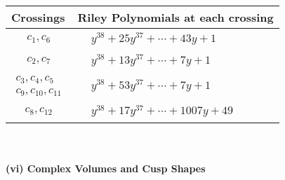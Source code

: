 \documentclass[1p]{elsarticle_modified}
\theoremstyle{definition}
\begin{document}
\begin{tabular}{m{50pt}|m{274pt}}
Crossings & \hspace{64pt}Riley Polynomials at each crossing \\
\hline $$\begin{aligned}c_{1},c_{6}\end{aligned}$$&$\begin{aligned}
&y^{38}+25 y^{37}+\cdots+43 y+1
\end{aligned}$\\
\hline $$\begin{aligned}c_{2},c_{7}\end{aligned}$$&$\begin{aligned}
&y^{38}+13 y^{37}+\cdots+7 y+1
\end{aligned}$\\
\hline $$\begin{aligned}c_{3},c_{4},c_{5}\\c_{9},c_{10},c_{11}\end{aligned}$$&$\begin{aligned}
&y^{38}+53 y^{37}+\cdots+7 y+1
\end{aligned}$\\
\hline $$\begin{aligned}c_{8},c_{12}\end{aligned}$$&$\begin{aligned}
&y^{38}+17 y^{37}+\cdots+1007 y+49
\end{aligned}$\\
\hline
\end{tabular}\\~\\
\newpage\flushleft \textbf{(vi) Complex Volumes and Cusp Shapes}
\end{document}
